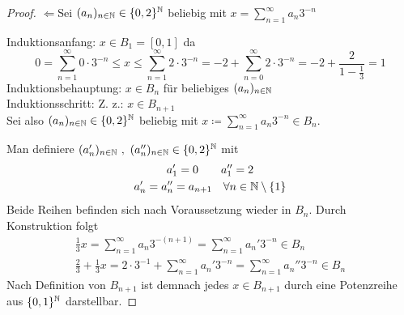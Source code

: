 \documentclass{anablatt}
\begin{document}
\begin{proof}
\glqq$\Leftarrow$\grqq \quad Sei $(a_n)_{n\in\mathbb{N}} \in \{0,2\}^{\mathbb{N}}$ beliebig mit $ x = \sum_{n=1}^\infty a_n3^{-n}$

Induktionsanfang: $x \in B_1 = [0,1]$ da
\[ 0 = \sum_{n=1}^\infty 0\cdot3^{-n} \leq x \leq \sum_{n=1}^\infty 2\cdot3^{-n} = -2 + \sum_{n=0}^\infty 2\cdot3^{-n} = -2 + \frac2{1-\frac13} = 1 \]
Induktionsbehauptung: \quad$ x \in B_n$ für beliebiges $(a_n)_{n\in\mathbb{N}}$ \\
Induktionsschritt: Z. z.: \quad $x \in B_{n+1}$ \\

Sei also $(a_n)_{n\in\mathbb{N}} \in \{0,2\}^{\mathbb{N}}$ beliebig mit $x \coloneqq \sum_{n=1}^\infty a_n3^{-n} \in B_n$.

Man definiere $(a_n')_{n\in\mathbb{N}} ~,~ (a_n'')_{n\in\mathbb{N}} \in \{0,2\}^{\mathbb{N}}$ mit
\begin{gather*}
    a_1' = 0 \qquad a_1'' = 2 \\ 
    a_n' = a_n'' = a_{n+1}  \quad\forall n \in \mathbb{N}\setminus\{1\}
\end{gather*}
Beide Reihen befinden sich nach Voraussetzung wieder in $B_n$. Durch Konstruktion folgt
\begin{gather*}
    \frac13x = \sum_{n=1}^\infty a_n3^{-(n+1)} = \sum_{n=1}^\infty a_n'3^{-n} \in B_n \\
    \frac23 + \frac13x = 2\cdot3^{-1} + \sum_{n=1}^\infty a_n'3^{-n} = \sum_{n=1}^\infty a_n''3^{-n} \in B_n
\end{gather*}
Nach Definition von $B_{n+1}$ ist demnach jedes $x \in B_{n+1}$ durch eine Potenzreihe aus $\{0,1\}^{\mathbb{N}}$ darstellbar.
\end{proof}
\end{document}
